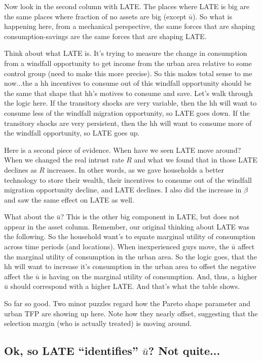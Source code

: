 \documentclass[pdftex,11pt]{article}
\begin{document}
Now look in the second column with LATE. The places where LATE is big are the same places where fraction of no assets are big (except $\bar u$). So what is happening here, from a mechanical perspective, the same forces that are shaping consumption-savings are the same forces that are shaping LATE.

Think about what LATE is. It's trying to measure the change in consumption from a windfall opportunity to get income from the urban area relative to some control group (need to make this more precise). So this makes total sense to me now...the a hh incentives to consume out of this windfall opportunity should be the same that shape that hh's motives to consume and save. Let's walk through the logic here. If the transitory shocks are very variable, then the hh will want to consume less of the windfall migration opportunity, so LATE goes down. If the transitory shocks are very persistent, then the hh will want to consume more of the windfall opportunity, so LATE goes up.

Here is a second piece of evidence. When have we seen LATE move around? When we changed the real intrust rate $R$ and what we found that in those LATE declines as $R$ increases. In other words, as we gave households a better technology to store their wealth, their incentives to consume out of the windfall migration opportunity decline, and LATE declines. I also did the increase in $\beta$ and saw the same effect on LATE as well.

What about the $\bar u$? This is the other big component in LATE, but does not appear in the asset column. Remember, our original thinking about LATE was the following. So the household want's to equate marginal utility of consumption across time periods (and locations). When inexperienced guys move, the $\bar u$ affect the marginal utility of consumption in the urban area. So the logic goes, that the hh will want to increase it's consumption in the urban area to offset the negative affect the $\bar u$ is having on the marginal utility of consumption. And, thus, a higher $\bar u$ should correspond with a higher LATE. And that's what the table shows.

So far so good. Two minor puzzles regard how the Pareto shape parameter and urban TFP are showing up here. Note how they nearly offset, suggesting that the selection margin (who is actually treated) is moving around.

\subsection{Ok, so LATE ``identifies'' $\bar u$? Not quite...}
\end{document}
